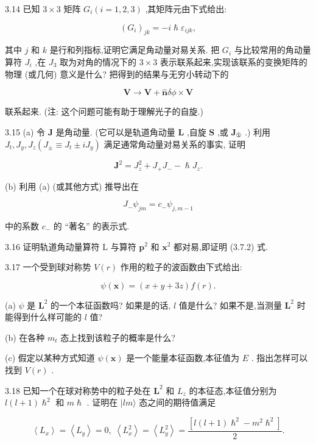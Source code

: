 3.14 已知 $3 \times 3$ 矩阵 ${G}_{i}\left( {i = 1,2,3}\right)$ ,其矩阵元由下式给出:

$$
{\left( {G}_{i}\right) }_{jk} = - i\hslash {\varepsilon }_{ijk},
$$

其中 $j$ 和 $k$ 是行和列指标,证明它满足角动量对易关系. 把 ${G}_{i}$ 与比较常用的角动量算符 ${J}_{i}$ ,在 ${J}_{3}$ 取为对角的情况下的 $3 \times 3$ 表示联系起来,实现该联系的变换矩阵的物理 (或几何) 意义是什么? 把得到的结果与无穷小转动下的

$$
\mathbf{V} \rightarrow \mathbf{V} + \widehat{\mathbf{n}}{\delta \phi } \times \mathbf{V}
$$

联系起来. (注: 这个问题可能有助于理解光子的自旋.)

3.15 (a) 令 $\mathbf{J}$ 是角动量. (它可以是轨道角动量 $\mathbf{L}$ ,自旋 $\mathbf{S}$ ,或 ${\mathbf{J}}_{\text{①}}$ .) 利用 ${J}_{t},{J}_{y},{J}_{z}\left( {{J}_{ \pm } \equiv {J}_{t} \pm i{J}_{y}}\right)$ 满足通常角动量对易关系的事实, 证明

$$
{\mathbf{J}}^{2} = {J}_{z}^{2} + {J}_{ + }{J}_{ - } - \hslash {J}_{z}.
$$

(b) 利用 (a) (或其他方式) 推导出在

$$
{J}_{ - }{\psi }_{jm} = {c}_{ - }{\psi }_{j, m - 1}
$$

中的系数 ${c}_{ - }$ 的 “著名” 的表示式.

3.16 证明轨道角动量算符 $\mathrm{L}$ 与算符 ${\mathbf{p}}^{2}$ 和 ${\mathbf{x}}^{2}$ 都对易,即证明 (3.7.2) 式.

3.17 一个受到球对称势 $V\left( r\right)$ 作用的粒子的波函数由下式给出:

$$
\psi \left( \mathbf{x}\right) = \left( {x + y + {3z}}\right) f\left( r\right) .
$$

(a) $\psi$ 是 ${\mathbf{L}}^{2}$ 的一个本征函数吗? 如果是的话, $l$ 值是什么? 如果不是,当测量 ${\mathbf{L}}^{2}$ 时能得到什么样可能的 $l$ 值?

(b) 在各种 ${m}_{t}$ 态上找到该粒子的概率是什么?

(c) 假定以某种方式知道 $\psi \left( \mathbf{x}\right)$ 是一个能量本征函数,本征值为 $E$ . 指出怎样可以找到 $V\left( r\right)$ .

3.18 已知一个在球对称势中的粒子处在 ${\mathbf{L}}^{2}$ 和 ${L}_{z}$ 的本征态,本征值分别为 $l\left( {l + 1}\right) {\hslash }^{2}$ 和 $m\hslash$ . 证明在 $|{lm}\rangle$ 态之间的期待值满足

$$
\left\langle {L}_{x}\right\rangle = \left\langle {L}_{y}\right\rangle = 0,\;\left\langle {L}_{x}^{2}\right\rangle = \left\langle {L}_{y}^{2}\right\rangle = \frac{\left\lbrack l\left( l + 1\right) {\hslash }^{2} - {m}^{2}{\hslash }^{2}\right\rbrack }{2}.
$$

